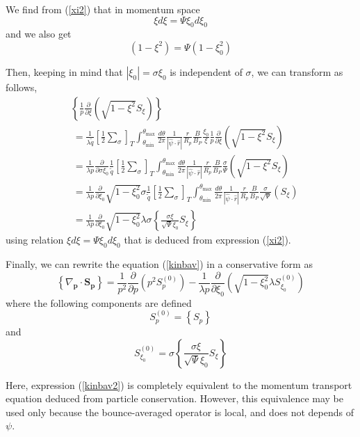 We find from (\ref{xi2}) that in momentum space
\begin{equation}
\xi d\xi=\Psi\xi_{0}d\xi_{0}%
\end{equation}
and we also get
\begin{equation}
\left(  1-\xi^{2}\right)  =\Psi\left(  1-\xi_{0}^{2}\right)
\end{equation}

Then, keeping in mind that $\left|  \xi_{0}\right|  =\sigma\xi_{0}$ is
independent of $\sigma$, we can transform as follows,
\begin{align}
&\left\{  \frac{1}{p}\frac{\partial}{\partial\xi}\left(  \sqrt{1-\xi^{2}}%
S_{\xi}\right)  \right\}   \nonumber\\
&\ =\frac{1}{\lambda\widetilde{q}}\left[  \frac
{1}{2}\sum_{\sigma}\right]  _{T}\int_{\theta_{\min}}^{\theta_{\max}}%
\frac{d\theta}{2\pi}\frac{1}{\left|  \widehat{\psi}\cdot\widehat{r}\right|
}\frac{r}{R_{p}}\frac{B}{B_{P}}\frac{\xi_{0}}{\xi}\frac{1}{p}\frac{\partial
}{\partial\xi}\left(  \sqrt{1-\xi^{2}}S_{\xi}\right) \nonumber\\
&\  =\frac{1}{\lambda
p}\frac{\partial}{\partial\sigma\xi_{0}}\frac
{1}{\widetilde{q}}\left[  \frac{1}{2}\sum_{\sigma}\right]
_{T}\int
_{\theta_{\min}}^{\theta_{\max}}\frac{d\theta}{2\pi}\frac{1}{\left|
\widehat{\psi}\cdot\widehat{r}\right|  }\frac{r}{R_{p}}\frac{B}{B_{P}}%
\frac{\sigma}{\Psi}\left(  \sqrt{1-\xi^{2}}S_{\xi}\right) \nonumber\\
&\  =\frac{1}{\lambda p}\frac{\partial}{\partial\xi_{0}}\sqrt{1-\xi_{0}^{2}%
}\sigma\frac{1}{\widetilde{q}}\left[
\frac{1}{2}\sum_{\sigma}\right]
_{T}\int_{\theta_{\min}}^{\theta_{\max}}\frac{d\theta}{2\pi}\frac{1}{\left|
\widehat{\psi}\cdot\widehat{r}\right|  }\frac{r}{R_{p}}\frac{B}{B_{P}}%
\frac{\sigma}{\sqrt{\Psi}}\left(  S_{\xi}\right) \nonumber\\
&\  =\frac{1}{\lambda p}\frac{\partial}{\partial\xi_{0}}\sqrt{1-\xi_{0}^{2}%
}\lambda\sigma\left\{
\frac{\sigma\xi}{\sqrt{\Psi}\xi_{0}}S_{\xi}\right\}
\end{align}
using relation $\xi d\xi=\Psi\xi_{0}d\xi_{0}$ that is deduced from expression
(\ref{xi2}).

Finally, we can rewrite the equation (\ref{kinbav}) in a conservative form as
\begin{equation}
\left\{  \nabla_{\mathbf{p}}\cdot\mathbf{S}_{\mathbf{p}}\right\}  =\frac
{1}{p^{2}}\frac{\partial}{\partial p}\left(  p^{2}S_{p}^{\left(  0\right)
}\right)  -\frac{1}{\lambda p}\frac{\partial}{\partial\xi_{0}}\left(
\sqrt{1-\xi_{0}^{2}}\lambda S_{\xi_{0}}^{\left(  0\right)  }\right)
\label{kinbav2}%
\end{equation}
where the following components are defined
\begin{equation}
S_{p}^{\left(  0\right)  }=\left\{  S_{p}\right\} \label{sp0}%
\end{equation}
and
\begin{equation}
S_{\xi_{0}}^{\left(  0\right)  }=\sigma\left\{  \frac{\sigma\xi}{\sqrt{\Psi
}\xi_{0}}S_{\xi}\right\} \label{smu0}%
\end{equation}

Here, expression (\ref{kinbav2}) is completely equivalent to the momentum
transport equation deduced from particle conservation. However, this
equivalence may be used only because the bounce-averaged operator is local,
and does not depends of $\psi.$
